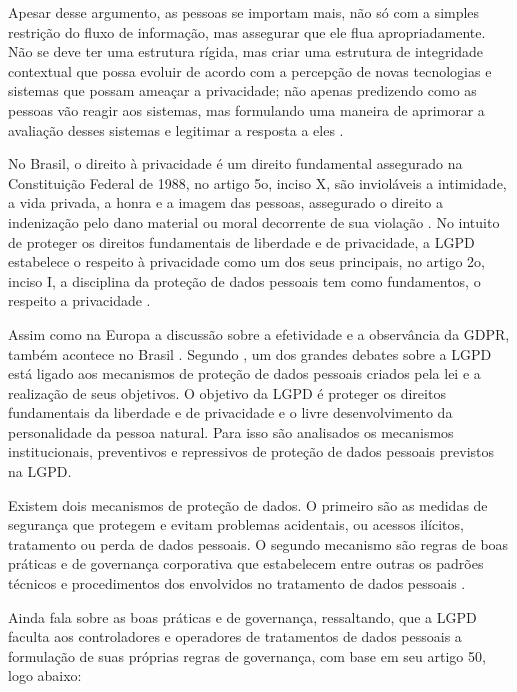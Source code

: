 Apesar desse argumento, as pessoas se importam mais, não só com a simples restrição do fluxo de informação, mas assegurar que ele flua apropriadamente. Não se deve ter uma estrutura rígida, mas criar uma estrutura de integridade contextual que possa evoluir de acordo com a percepção de novas tecnologias e sistemas que possam ameaçar a privacidade; não apenas predizendo como as pessoas vão reagir aos sistemas, mas formulando uma maneira de aprimorar a avaliação desses sistemas e legitimar a resposta a eles \citep{Nissenbaum+2009}.

No Brasil, o direito à privacidade é um direito fundamental assegurado na Constituição Federal de 1988, no artigo 5o, inciso X, são invioláveis a intimidade, a vida privada, a honra e a imagem das pessoas, assegurado o direito a indenização pelo dano material ou moral decorrente de sua violação \citep{Constitucao1988:online}. No intuito de proteger os direitos fundamentais de liberdade e de privacidade, a LGPD estabelece o respeito à privacidade como um dos seus principais, no artigo 2o, inciso I, a disciplina da proteção de dados pessoais tem como fundamentos, o respeito a privacidade \citep{L13709_2018:online}.

Assim como na Europa a discussão sobre a efetividade e a observância da GDPR, também acontece no Brasil \citep{monteiro_efetividade_2019}. Segundo \citet{monteiro_efetividade_2019}, um dos grandes debates sobre a LGPD está ligado aos mecanismos de proteção de dados pessoais criados pela lei e a realização de seus objetivos. O objetivo da LGPD é proteger os direitos fundamentais da liberdade e de privacidade e o livre desenvolvimento da personalidade da pessoa natural. Para isso são analisados os mecanismos institucionais, preventivos e repressivos de proteção de dados pessoais previstos na LGPD.

Existem dois mecanismos de proteção de dados. O primeiro são as medidas de segurança que protegem e evitam problemas acidentais, ou acessos ilícitos, tratamento ou perda de dados pessoais. O segundo mecanismo são regras de boas práticas e de governança corporativa que estabelecem entre outras os padrões técnicos e procedimentos dos envolvidos no tratamento de dados pessoais \citep{monteiro_efetividade_2019}.


Ainda \citet{monteiro_efetividade_2019} fala sobre as boas práticas e de governança, ressaltando, que a LGPD faculta aos controladores e operadores de tratamentos de dados pessoais a formulação de suas próprias regras de governança, com base em seu artigo 50, logo abaixo:

